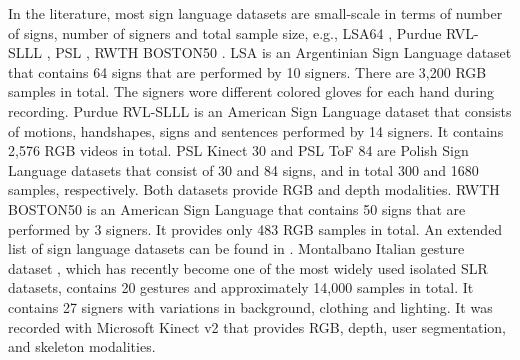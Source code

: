 \documentclass[11pt, a4paper, singlecolumn]{article}
\begin{document}
In the literature, most sign language datasets are small-scale in terms of number of signs, number of signers and total sample size, e.g., LSA64 \cite{ronchetti2016lsa64}, Purdue RVL-SLLL \cite{martinez2002purdue}, PSL \cite{kapuscinski2015recognition}, RWTH BOSTON50 \cite{zahedi2005combination}. LSA \cite{ronchetti2016lsa64} is an Argentinian  Sign Language dataset that contains 64 signs that are performed by 10 signers. There are 3,200 RGB samples in total. The signers wore different colored gloves for each hand during recording. Purdue RVL-SLLL \cite{martinez2002purdue} is an American Sign Language dataset that consists of motions, handshapes, signs and sentences performed by 14 signers. It contains 2,576 RGB videos in total. PSL Kinect 30  \cite{kapuscinski2015recognition} and  PSL ToF 84  \cite{kapuscinski2015recognition} are Polish Sign Language datasets that consist of 30 and 84 signs, and in total 300 and 1680 samples, respectively. Both datasets provide RGB and depth modalities. RWTH BOSTON50 \cite{zahedi2005combination} is an American Sign Language that contains 50 signs that are performed by 3 signers. It provides only 483 RGB samples in total. An extended list of sign language datasets can be found in \cite{li2020word, bragg2019sign}.  Montalbano Italian gesture dataset \cite{escalera2014chalearn}, which has recently become one of the most widely used isolated SLR datasets, contains 20 gestures and approximately 14,000 samples in total. It contains 27 signers with variations in background, clothing and lighting. It was recorded with Microsoft Kinect v2 that provides RGB, depth, user segmentation, and skeleton modalities.
\end{document}
